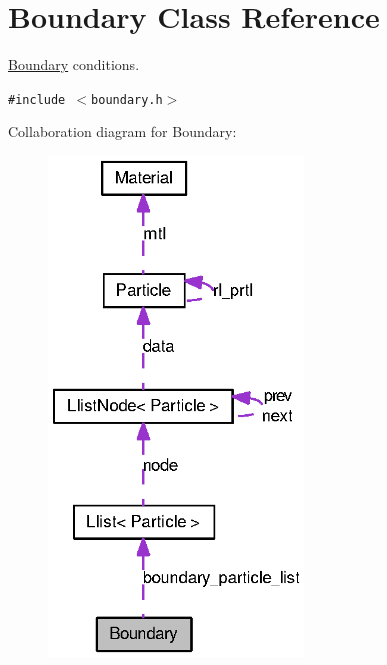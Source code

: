 \hypertarget{classBoundary}{
\section{Boundary Class Reference}
\label{classBoundary}
}
\hyperlink{classBoundary}{Boundary} conditions.  


{\tt \#include $<$boundary.h$>$}

Collaboration diagram for Boundary:\nopagebreak
\begin{figure}[H]
\begin{center}
\leavevmode
\includegraphics[width=192pt]{classBoundary__coll__graph}
\end{center}
\end{figure}
